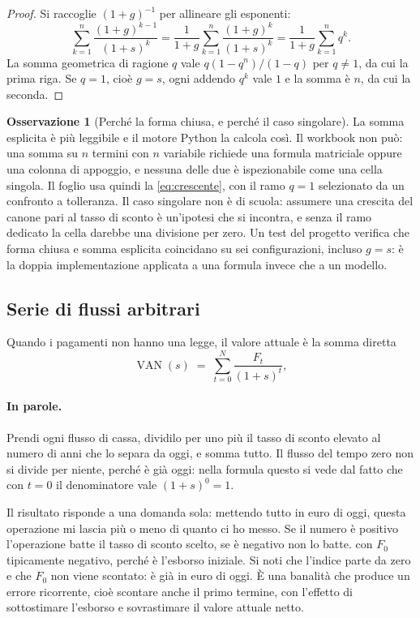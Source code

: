 \documentclass[11pt,a4paper]{article}
\theoremstyle{definition}
\newtheorem{osservazione}[definizione]{Osservazione}
\theoremstyle{plain}
\DeclareMathOperator{\VAN}{VAN}
\begin{document}
\begin{proof}
Si raccoglie $(1+g)^{-1}$ per allineare gli esponenti:
\[
\sum_{k=1}^{n} \frac{(1+g)^{k-1}}{(1+s)^k}
= \frac{1}{1+g}\sum_{k=1}^{n} \frac{(1+g)^{k}}{(1+s)^k}
= \frac{1}{1+g}\sum_{k=1}^{n} q^{k}.
\]
La somma geometrica di ragione $q$ vale $q(1-q^n)/(1-q)$ per $q\neq 1$, da cui la prima riga. Se $q=1$, cioè $g=s$, ogni addendo $q^k$ vale $1$ e la somma è $n$, da cui la seconda.
\end{proof}

\begin{osservazione}[Perché la forma chiusa, e perché il caso singolare]
La somma esplicita è più leggibile e il motore Python la calcola così. Il workbook non può: una somma su $n$ termini con $n$ variabile richiede una formula matriciale oppure una colonna di appoggio, e nessuna delle due è ispezionabile come una cella singola. Il foglio usa quindi la \eqref{eq:crescente}, con il ramo $q=1$ selezionato da un confronto a tolleranza. Il caso singolare non è di scuola: assumere una crescita del canone pari al tasso di sconto è un'ipotesi che si incontra, e senza il ramo dedicato la cella darebbe una divisione per zero. Un test del progetto verifica che forma chiusa e somma esplicita coincidano su sei configurazioni, incluso $g=s$: è la doppia implementazione applicata a una formula invece che a un modello.
\end{osservazione}

\subsection{Serie di flussi arbitrari}

Quando i pagamenti non hanno una legge, il valore attuale è la somma diretta
\begin{equation}
\VAN(s) \;=\; \sum_{t=0}^{N} \frac{F_t}{(1+s)^t},
\label{eq:van}
\end{equation}

\paragraph{In parole.} Prendi ogni flusso di cassa, dividilo per uno più il tasso di sconto elevato al numero di anni che lo separa da oggi, e somma tutto. Il flusso del tempo zero non si divide per niente, perché è già oggi: nella formula questo si vede dal fatto che con $t=0$ il denominatore vale $(1+s)^0 = 1$.

Il risultato risponde a una domanda sola: mettendo tutto in euro di oggi, questa operazione mi lascia più o meno di quanto ci ho messo. Se il numero è positivo l'operazione batte il tasso di sconto scelto, se è negativo non lo batte.
con $F_0$ tipicamente negativo, perché è l'esborso iniziale. Si noti che l'indice parte da zero e che $F_0$ non viene scontato: è già in euro di oggi. È una banalità che produce un errore ricorrente, cioè scontare anche il primo termine, con l'effetto di sottostimare l'esborso e sovrastimare il valore attuale netto.
\end{document}
